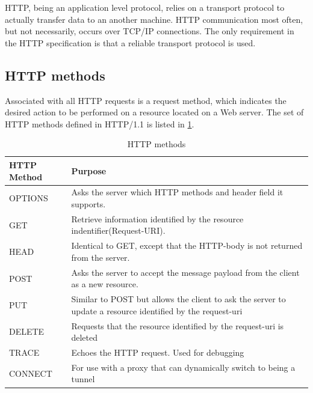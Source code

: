 HTTP, being an application level protocol, relies on a transport protocol to
actually transfer data to an another machine. HTTP communication most often, but
not necessarily, occurs over TCP/IP connections. The only requirement in the HTTP
specification is that a reliable transport protocol is used.

\subsection{HTTP methods}

 Associated with all HTTP requests is a request method, which indicates the
 desired action to be performed on a resource located on a Web server. The set
 of HTTP methods defined in HTTP/1.1 is listed in \cref{table-http-methods}.

 \begin{table}[h]
 \begin{tabularx}{\textwidth}{| X | X |}
 \hline
   \textbf{HTTP Method} & \textbf{Purpose} \\ \hline
   OPTIONS & Asks the server which HTTP methods and header field it supports. \\ \hline
   GET & Retrieve information identified by the resource indentifier(Request-URI). \\ \hline
   HEAD & Identical to GET, except that the HTTP-body is not returned from the server. \\ \hline
   POST & Asks the server to accept the message payload from the client as a new resource.\\ \hline
   PUT & Similar to POST but allows the client to ask the server to update a resource identified by the request-uri \\ \hline
   DELETE & Requests that the resource identified by the request-uri is deleted \\ \hline
   TRACE & Echoes the HTTP request. Used for debugging \\ \hline
   CONNECT & For use with a proxy that can dynamically switch to being a tunnel\\ \hline
 \end{tabularx}
 \caption{HTTP methods}
 \label{table-http-methods}
 \end{table}

\section{}
\label{tcp}

